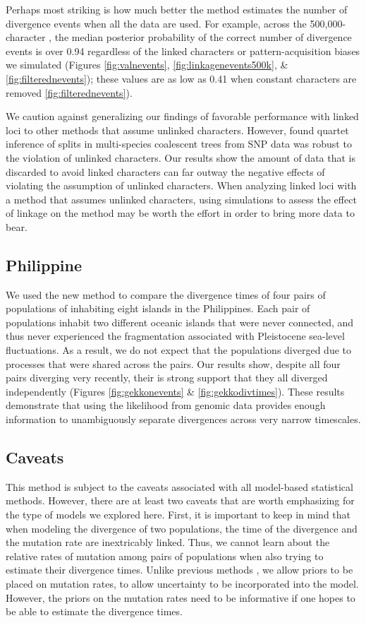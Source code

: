 Perhaps most striking is how much better the method estimates the number
of divergence events when all the data are used.
For example, across the 500,000-character \datasets, the
median posterior probability of the correct number of divergence events
is over 0.94 regardless of the linked characters
or pattern-acquisition biases we simulated
(Figures
\ref{fig:valnevents},
\ref{fig:linkagenevents500k},
\&
\ref{fig:filterednevents});
these values are as low as 0.41 when constant characters are removed
\ref{fig:filterednevents}).

We caution against generalizing our findings
of favorable performance with linked loci
to other methods that assume unlinked characters.
However, 
\citet{ChifmanKubatko2014}
found quartet inference of splits in multi-species coalescent trees
from SNP data was robust to the violation of unlinked characters.
Our results show the amount of data that is discarded to avoid linked
characters can far outway the negative effects of violating the assumption of
unlinked characters.
When analyzing linked loci with a method that assumes unlinked characters,
using simulations to assess the effect of linkage on the method may be worth
the effort in order to bring more data to bear.


\subsection{Philippine }
We used the new method to compare the divergence times of four pairs
of populations of  inhabiting eight islands in the Philippines.
Each pair of populations inhabit two different oceanic islands that were never
connected, and thus never experienced the fragmentation associated with
Pleistocene sea-level fluctuations.
As a result, we do not expect that the populations diverged due to processes
that were shared across the pairs.
Our results show, despite all four pairs diverging very recently,
their is strong support that they all diverged independently
(Figures
\ref{fig:gekkonevents}
\& 
\ref{fig:gekkodivtimes}).
These results demonstrate that using the likelihood from genomic data provides
enough information to unambiguously separate divergences across very narrow
timescales.

\subsection{Caveats}
This method is subject to the caveats associated with all model-based
statistical methods.
However, there are at least two caveats that are worth emphasizing for the type
of models we explored here.
First, it is important to keep in mind that when modeling the divergence of two
populations, the time of the divergence and the mutation rate are inextricably
linked.
Thus, we cannot learn about the relative rates of mutation among pairs of
populations when also trying to estimate their divergence times.
Unlike previous methods \citep{Hickerson2006,Huang2011,Oaks2014dpp},
we allow priors to be placed on mutation rates, to allow uncertainty
to be incorporated into the model.
However, the priors on the mutation rates need to be informative if one hopes
to be able to estimate the divergence times.


